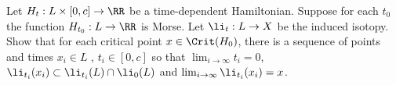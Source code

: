 

	Let $H_t: L\times [0, c]\to \RR$ be a time-dependent Hamiltonian. 
	Suppose for each $t_0$ the function $H_{t_0}: L\to \RR$ is Morse.
	Let $\li_t: L\to X$ be the induced isotopy. 
	Show that for each critical point $x\in \Crit(H_0)$, there is a sequence of points and times $x_i\in L$ , $t_i\in [0, c]$ so that $\lim_{i\to\infty} t_i=0$, $\li_{t_i}(x_i)\subset\li_{t_i}(L)\cap \li_{0}(L)$ and $\lim_{i\to\infty}\li_{t_i}(x_i)=x$. 

